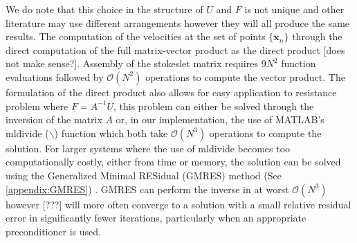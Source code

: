 We do note that this choice in the structure of $U$ and $F$ is not unique and other literature may use different arrangements however they will all produce the same results. The computation of the velocities at the set of points $\{\bm{x}_n\}$ through the direct computation of the full matrix-vector product as the direct product [does not make sense?]. Assembly of the stokeslet matrix requires $9N^2$ function evaluations followed by $\mathcal{O}(N^2)$ operations to compute the vector product. The formulation of the direct product also allows for easy application to resistance problem where $\underline{F} = A^{-1} \underline{U}$, this problem can either be solved through the inversion of the matrix $A$ or, in our implementation, the use of MATLAB's mldivide ($\backslash$) function which both take $\mathcal{O}(N^3)$ operations to compute the solution. For larger systems where the use of mldivide becomes too computationally costly, either from time or memory, the solution can be solved using the Generalized Minimal RESidual (GMRES) method (See \cref{appendix:GMRES}) \cite{Saad1986GMRES:Systems,Elman2005FiniteDynamics}. GMRES can perform the inverse in at worst $\mathcal{O}(N^3)$ however [???] will more often converge to a solution with a small relative residual error in significantly fewer iterations, particularly when an appropriate preconditioner is used.